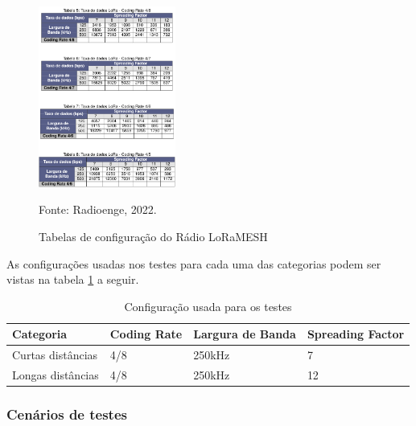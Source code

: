 \begin{figure}[H]
    \centering
	\caption{Tabelas de configuração do Rádio LoRaMESH}
    \includegraphics[width=0.4\textwidth,keepaspectratio]{img/lora-config.png}
    \label{fig:lora-config}
    
    Fonte: Radioenge, 2022.
\end{figure}

\newpage

As configurações usadas nos testes para cada uma das categorias podem ser vistas na
tabela \ref{tab:config} a seguir.

\begin{longtable}{|l|l|l|l|}
    \caption{Configuração usada para os testes}\label{tab:config}\\
    \hline
    \textbf{Categoria} & \textbf{Coding Rate} & \textbf{Largura de Banda} & \textbf{Spreading Factor} \\
    \hline
    Curtas distâncias & 4/8 & 250kHz & 7 \\
    \hline
    Longas distâncias & 4/8 & 250kHz & 12 \\
    \hline
\end{longtable}

\subsubsection{Cenários de testes}

